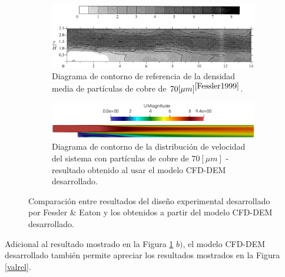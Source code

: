 \begin{figure}[h!]
	\centering
	\begin{subfigure}[b]{\textwidth}
		\centering
		\includegraphics[width=\textwidth]{Images/contour1999.png}
		\caption{Diagrama de contorno de referencia de la densidad media de part\'iculas de cobre de $70 [\mu m]^{\cite{Fessler1999}}$.}
	\end{subfigure}
	\hfill
	\begin{subfigure}[b]{\textwidth}
		\centering
		\includegraphics[width=\textwidth]{Images/valvel.png}
		\caption{Diagrama de contorno de la distribuci\'on de velocidad del sistema con part\'iculas de cobre de $70 [\mu m]$ - resultado obtenido al usar el modelo CFD-DEM desarrollado.}
	\end{subfigure}
	\caption{Comparaci\'on entre resultados del dise\~no experimental desarrollado por Fessler \& Eaton y los obtenidos a partir del modelo CFD-DEM desarrollado.}
	\label{resul1999}
\end{figure}

\noindent
\justify

Adicional al resultado mostrado en la Figura \ref{resul1999} $b)$, el modelo CFD-DEM desarrollado tambi\'en permite apreciar los resultados mostrados en la Figura \ref{valrel}.

